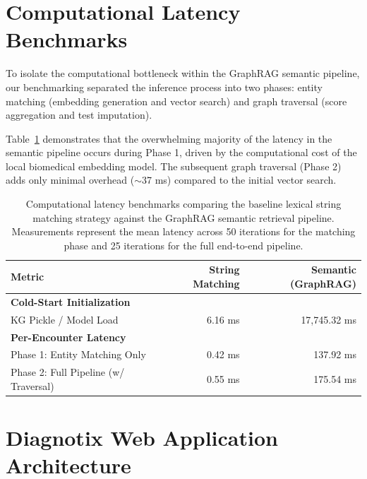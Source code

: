 \documentclass[pmlr]{jmlr}%
\begin{document}
\section{Computational Latency Benchmarks}
\label{app:latency_benchmarks}

To isolate the computational bottleneck within the GraphRAG semantic pipeline, our benchmarking separated the inference process into two phases: entity matching (embedding generation and vector search) and graph traversal (score aggregation and test imputation).

Table~\ref{tab:latency_benchmarks} demonstrates that the overwhelming majority of the latency in the semantic pipeline occurs during Phase 1, driven by the computational cost of the local biomedical embedding model. The subsequent graph traversal (Phase 2) adds only minimal overhead ($\sim$37 ms) compared to the initial vector search.

\begin{table}[htbp]
    \centering
    \caption{Computational latency benchmarks comparing the baseline lexical string matching strategy against the GraphRAG semantic retrieval pipeline. Measurements represent the mean latency across 50 iterations for the matching phase and 25 iterations for the full end-to-end pipeline.}
    \label{tab:latency_benchmarks}
    \begin{tabular}{lrr}
        \toprule
        \textbf{Metric} & \textbf{String Matching} & \textbf{Semantic (GraphRAG)} \\
        \midrule
        \textbf{Cold-Start Initialization} & & \\
        \hspace{3mm} KG Pickle / Model Load & 6.16 ms & 17,745.32 ms \\
        \addlinespace
        \textbf{Per-Encounter Latency} & & \\
        \hspace{3mm} Phase 1: Entity Matching Only & 0.42 ms & 137.92 ms \\
        \hspace{3mm} Phase 2: Full Pipeline (w/ Traversal) & 0.55 ms & 175.54 ms \\
        \bottomrule
    \end{tabular}
\end{table}

\section{Diagnotix Web Application Architecture}
\label{app:diagnotix}
\end{document}
